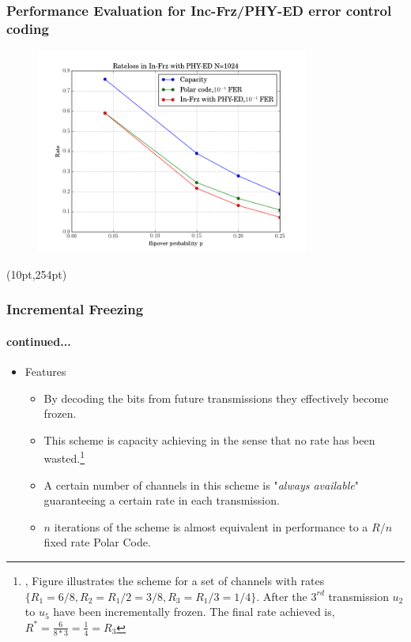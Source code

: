 \documentclass[xcolor=dvipsnames]{beamer}
\newcommand\hyperback[1]{%
  \begin{textblock*}{\paperwidth}(10pt,254pt)
    \raggedright #1\hspace{.5em}
  \end{textblock*}}
\begin{document}
\begin{frame}[label=pch3]
\frametitle{Performance Evaluation for Inc-Frz/PHY-ED error control coding}
\begin{figure}
\centering
\includegraphics[width=9cm]{./rateloss_channel.png}
\end{figure}
\hyperback{\hyperlink{psw3}{}}
\end{frame}
\begin{frame}[label = incfrz2]
\frametitle{Incremental Freezing}
\framesubtitle{continued...}
\begin{itemize}
\item Features
\begin{itemize}
\item By decoding the bits from future transmissions they effectively become frozen.
\item This scheme is capacity achieving in the sense that no rate has been wasted.\footnote{\tiny, Figure illustrates the scheme for a set of channels with rates $\{ R_1=6/8, R_2= R_1/2=3/8,R_3= R_1/3=1/4\}$. After the $3^{rd}$ transmission  $u_2$ to $u_{5}$ have been incrementally frozen. The final rate achieved is, $R^*= \frac{6}{8*3}=\frac{1}{4}=R_3 $}
\item A certain number of channels in this scheme is "\emph{always available}" guaranteeing a certain rate in each transmission. 
\item $n$ iterations of the scheme is almost equivalent in performance to a $R/n$ fixed rate Polar Code.
\end{itemize}
\end{itemize}
\end{frame}
\end{document}
